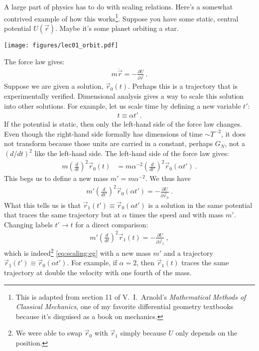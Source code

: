 A large part of physics has to do with scaling relations. Here’s a somewhat contrived example of how this works\footnote{This is adapted from section 11 of V.\ I.\ Arnold's \emph{Mathematical Methods of Classical Mechanics}, one of my favorite differential geometry textbooks because it's disguised as a book on mechanics.}. Suppose you have some static, central potential $U(\vec r)$. Maybe it’s some planet orbiting a star. 

\begin{center}
\texttt{[image: figures/lec01\_orbit.pdf]}
\end{center}

The force law gives:
\begin{align}
  m 
  \ddot{\vec{r}} = - \frac{\partial U}{\partial\vec{r}} \ .
  \label{eq:scaling:eg}
\end{align}
Suppose we are given a solution, $\vec r_0(t)$. Perhaps this is a trajectory that is experimentally verified. Dimensional analysis gives a way to scale this solution into other solutions. For example, let us scale time by defining a new variable $t'$:
\begin{align}
  t \equiv \alpha t' \ .
\end{align}
If the potential is static, then only the left-hand side of the force law changes. Even though the right-hand side formally has dimensions of time $\sim T^{-2}$, it does not transform because those units are carried in a constant, perhaps $G_N$, not a $(d/dt)^2$ like the left-hand side. The left-hand side of the force law gives:
\begin{align}
  m\left(\frac{d}{dt}\right)^2 \vec r_0(t) 
  &=
  m\alpha^{-2} \left(\frac{d}{dt'}\right)^2 \vec r_0(\alpha t') \ .
\end{align}
This begs us to define a new mass $m' = m\alpha^{-2}$. We thus have
\begin{align}
   m' \left(\frac{d}{dt'}\right)^2 {\vec{r}_0}(\alpha t')
  = - \frac{\partial U}{\partial\vec{r}_0} \ .
\end{align}
What this tells us is that $\vec r_1(t') \equiv \vec{r}_0(\alpha t')$ is a solution in the same potential that traces the same trajectory but at $\alpha$ times the speed and with mass $m'$. Changing labels $t'\to t$ for a direct comparison:
\begin{align}
   m' \left(\frac{d}{dt}\right)^2 {\vec{r}_1}(t)
  = - \frac{\partial U}{\partial\vec{r}_1} \ ,
\end{align}
which is indeed\footnote{We were able to swap $\vec r_0$ with $\vec r_1$ simply because $U$ only depends on the position.} \eqref{eq:scaling:eg} with a new mass $m'$ and a trajectory $\vec r_1(t') \equiv \vec{r}_0(\alpha t')$. For example, if $\alpha = 2$, then $\vec r_1(t)$ traces the same trajectory at double the velocity with one fourth of the mass.

